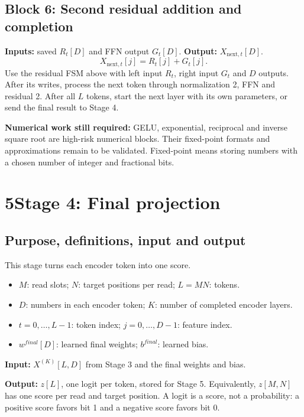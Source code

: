 \documentclass[11pt,a4paper]{article}
\begin{document}
\subsection*{Block 6: Second residual addition and completion}
\textbf{Inputs:} saved $R_t[D]$ and FFN output $G_t[D]$.
\textbf{Output:} $X_{\mathrm{next},t}[D]$.
\[
X_{\mathrm{next},t}[j]=R_t[j]+G_t[j].
\]
Use the residual FSM above with left input $R_t$, right input $G_t$ and $D$ outputs. After its writes, process the next token through normalization 2, FFN and residual 2. After all $L$ tokens, start the next layer with its own parameters, or send the final result to Stage 4.

\textbf{Numerical work still required:} GELU, exponential, reciprocal and inverse square root are high-risk numerical blocks. Their fixed-point formats and approximations remain to be validated. Fixed-point means storing numbers with a chosen number of integer and fractional bits.

\newpage
\section*{5\quad Stage 4: Final projection}
\subsection*{Purpose, definitions, input and output}
This stage turns each encoder token into one score.
\begin{itemize}
\item $M$: read slots; $N$: target positions per read; $L=MN$: tokens.
\item $D$: numbers in each encoder token; $K$: number of completed encoder layers.
\item $t=0,\ldots,L-1$: token index; $j=0,\ldots,D-1$: feature index.
\item $w^{final}[D]$: learned final weights; $b^{final}$: learned bias.
\end{itemize}
\textbf{Input:} $X^{(K)}[L,D]$ from Stage 3 and the final weights and bias.

\textbf{Output:} $z[L]$, one logit per token, stored for Stage 5. Equivalently, $z[M,N]$ has one score per read and target position. A logit is a score, not a probability: a positive score favors bit 1 and a negative score favors bit 0.
\end{document}
